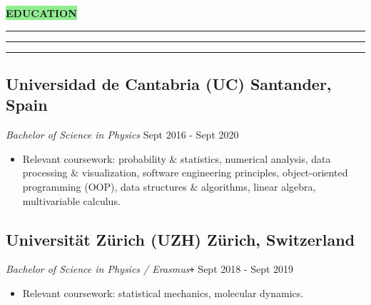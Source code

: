 \documentclass{resume}
\def\Plus{\texttt{+}}
\renewenvironment{rSection}[1]{
\sectionskip
\vspace{-3.5pt}
\colorbox{lightGreen}{\hspace{-3pt}\MakeUppercase{\large{\textbf{#1}}}}
\vspace{3pt}
\hrule
\hrule
\hrule
\begin{list}{}{
\setlength{\leftmargin}{1.5em}
}
\item[]
}{
\end{list}
}
\begin{document}
\begin{rSection}{Education}

\begin{adjustwidth}{-6mm}{0pt}
\vspace{-5pt}
\normalsize
\subsection*{Universidad de Cantabria (UC) \hfill \normalsize{Santander, Spain}}
\vspace{-7pt}
\textit{Bachelor of Science in Physics} \hfill Sept 2016 - Sept 2020
\end{adjustwidth}
\vspace{-5pt}

\begin{adjustwidth}{-6.5mm}{0pt}
\begin{itemize}
    \item Relevant coursework: probability $\&$ statistics, numerical analysis, data processing $\&$ visualization, software engineering principles, object-oriented programming (OOP), data structures $\&$ algorithms, linear algebra, multivariable calculus.
\end{itemize}
\end{adjustwidth}

\vspace{-10pt}
\vspace{-22pt}

\begin{adjustwidth}{-6mm}{0pt}
\vspace{-5pt}
\normalsize
\subsection*{Universit{\"a}t Z{\"u}rich (UZH) \hfill \normalsize{Z{\"u}rich, Switzerland}}
\vspace{-7pt}
\textit{Bachelor of Science in Physics / Erasmus\Plus} \hfill Sept 2018 - Sept 2019
\end{adjustwidth}
\vspace{-5pt}

\begin{adjustwidth}{-6.5mm}{0pt}
\begin{itemize}
    \item Relevant coursework: statistical mechanics, molecular dynamics.
\end{itemize}
\end{adjustwidth}

\end{rSection}
\end{document}
